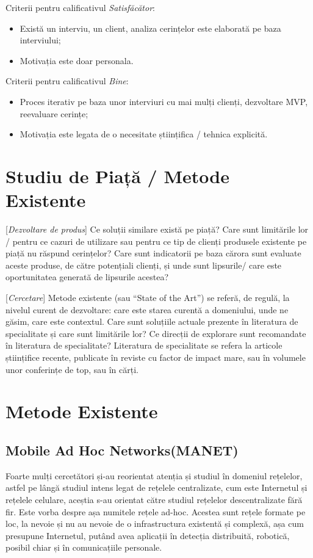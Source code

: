\documentclass[12pt,a4paper]{report}
\newcommand{\worktype}[1]{[\textit{#1}] }
\newcommand{\dezvoltare}{\worktype{Dezvoltare de produs}}
\newcommand{\cercetare}{\worktype{Cercetare}}
\begin{document}
Criterii pentru calificativul \textit{Satisfăcător}: 
\begin{itemize}
	\item \dezvoltare Există un interviu, un client, analiza cerințelor este elaborată pe baza interviului;
	\item \cercetare Motivația este doar personala.
\end{itemize}


Criterii pentru calificativul \textit{Bine}: 
\begin{itemize}
	\item	 \dezvoltare Proces iterativ pe baza unor interviuri cu mai mulți clienți, dezvoltare MVP, reevaluare cerințe;
	\item	 \cercetare Motivația este legata de o necesitate științifica / tehnica explicită.
\end{itemize}


\chapter{Studiu de Piață / Metode Existente}
\dezvoltare Ce soluții similare există pe piață? Care sunt limitările lor / pentru ce cazuri de utilizare sau pentru ce tip de clienți produsele existente pe piață nu răspund cerințelor? Care sunt indicatorii pe baza cărora sunt evaluate aceste produse, de către potențiali clienți, și unde sunt lipsurile/ care este oportunitatea generată de lipsurile acestea?

\cercetare Metode existente (sau ``State of the Art'') se referă, de regulă, la nivelul curent de dezvoltare: care este starea curentă a domeniului, unde ne găsim, care este contextul. Care sunt soluțiile actuale prezente în literatura de specialitate și care sunt limitările lor? Ce direcții de explorare sunt recomandate în literatura de specialitate? Literatura de specialitate se refera la articole științifice recente, publicate în reviste cu factor de impact mare, sau în volumele unor conferințe de top, sau în cărți.

\chapter{Metode Existente}

\section{Mobile Ad Hoc Networks(MANET)}
Foarte mulți cercetători și-au reorientat atenția și studiul în domeniul rețelelor, astfel pe lângă studiul intens legat de rețelele centralizate, cum este Internetul și rețelele celulare, aceștia s-au orientat către studiul rețelelor descentralizate fără fir. Este vorba despre așa numitele rețele ad-hoc\cite{MITArticle}. Acestea sunt rețele formate pe loc, la nevoie și nu au nevoie de o infrastructura existentă și complexă, așa cum presupune Internetul, putând avea aplicații în detecția distribuită, robotică, posibil chiar și în comunicațiile personale.
\end{document}
